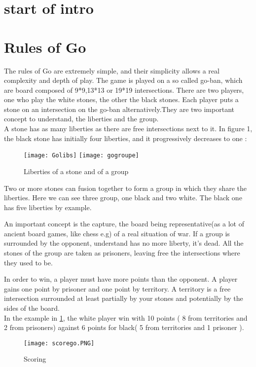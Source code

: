 \section{start of intro}

\section{Rules of Go}

The rules of Go are extremely simple, and their simplicity allows a real complexity and depth of play. The game is played on a so called go-ban, which are board composed of 9*9,13*13 or 19*19 intersections. There are two players, one who play the white stones, the other the black stones. Each player puts a stone on an intersection on the go-ban alternatively.They are two important concept to understand, the liberties and the group. 
\\

A stone has as many liberties as there are free intersections next to it. In figure 1, the black stone has initially four liberties, and it progressively decreases to one : 

\begin{figure}
\begin{center}
\texttt{[image: Golibs]}
\texttt{[image: gogroupe]}
\caption{Liberties of a stone and of a group}
\end{center}

\end{figure}
Two or more stones can fusion together to form a group in which they share the liberties. Here we can see three group, one black and two white. The black one has five liberties by example. 


An important concept is the capture, the board being representative(as a lot of ancient board games, like chess e.g) of a real situation of war. If a group is surrounded by the opponent, understand has no more liberty, it's dead. All the stones of the group are taken as prisoners, leaving free the intersections where they used to be. 

In order to win, a player must have more points than the opponent. A player gains one point by prisoner and one point by territory. A territory is a free intersection surrounded at least partially by your stones and potentially by the sides of the board. 
\\

In the example in \ref{score}, the white player win with 10 points ( 8 from territories and 2 from prisoners) against 	6 points for black( 5 from territories and 1 prisoner ). 
\begin{figure}
\begin{center}
\texttt{[image: scorego.PNG]}
\end{center}
\caption{Scoring}
\label{score}
\end{figure}